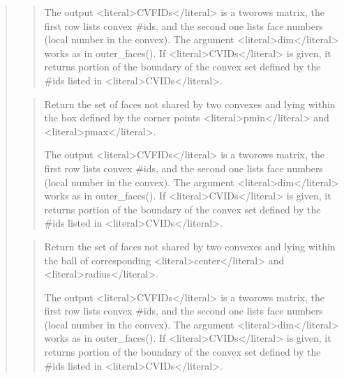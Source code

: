 \documentclass[a4paper,11pt,english]{sphinxmanual}
\begin{document}
\begin{quote}
\begin{quote}
\sphinxAtStartPar
The output \textless{}literal\textgreater{}CVFIDs\textless{}/literal\textgreater{} is a two\sphinxhyphen{}rows matrix, the first row lists convex
\#ids, and the second one lists face numbers (local number in the
convex). The argument \textless{}literal\textgreater{}dim\textless{}/literal\textgreater{} works as in outer\_faces().
If \textless{}literal\textgreater{}CVIDs\textless{}/literal\textgreater{} is given, it returns portion of the boundary of
the convex set defined by the \#ids listed in \textless{}literal\textgreater{}CVIDs\textless{}/literal\textgreater{}.
\end{quote}

\sphinxAtStartPar
{}
\begin{quote}

\sphinxAtStartPar
Return the set of faces not shared by two convexes and lying within the box defined by the corner points \textless{}literal\textgreater{}pmin\textless{}/literal\textgreater{} and \textless{}literal\textgreater{}pmax\textless{}/literal\textgreater{}.

\sphinxAtStartPar
The output \textless{}literal\textgreater{}CVFIDs\textless{}/literal\textgreater{} is a two\sphinxhyphen{}rows matrix, the first row lists convex
\#ids, and the second one lists face numbers (local number in the
convex). The argument \textless{}literal\textgreater{}dim\textless{}/literal\textgreater{} works as in outer\_faces().
If \textless{}literal\textgreater{}CVIDs\textless{}/literal\textgreater{} is given, it returns portion of the boundary of
the convex set defined by the \#ids listed in \textless{}literal\textgreater{}CVIDs\textless{}/literal\textgreater{}.
\end{quote}

\sphinxAtStartPar
{}
\begin{quote}

\sphinxAtStartPar
Return the set of faces not shared by two convexes and lying within the ball of corresponding \textless{}literal\textgreater{}center\textless{}/literal\textgreater{} and \textless{}literal\textgreater{}radius\textless{}/literal\textgreater{}.

\sphinxAtStartPar
The output \textless{}literal\textgreater{}CVFIDs\textless{}/literal\textgreater{} is a two\sphinxhyphen{}rows matrix, the first row lists convex
\#ids, and the second one lists face numbers (local number in the
convex). The argument \textless{}literal\textgreater{}dim\textless{}/literal\textgreater{} works as in outer\_faces().
If \textless{}literal\textgreater{}CVIDs\textless{}/literal\textgreater{} is given, it returns portion of the boundary of
the convex set defined by the \#ids listed in \textless{}literal\textgreater{}CVIDs\textless{}/literal\textgreater{}.
\end{quote}


\end{quote}
\end{document}
